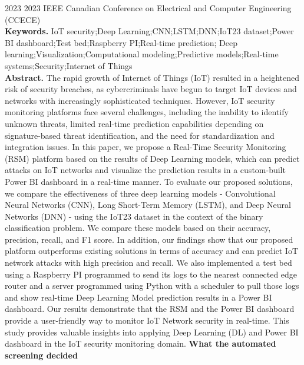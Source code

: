 \documentclass[11pt,a4paper]{article}
\begin{document}
{\color{soft}\small 2023 \textperiodcentered{} 2023 IEEE Canadian Conference on Electrical and Computer Engineering (CCECE)}\\[2mm]
{\small\textbf{Keywords.} IoT security;Deep Learning;CNN;LSTM;DNN;IoT23 dataset;Power BI dashboard;Test bed;Raspberry PI;Real-time prediction; Deep learning;Visualization;Computational modeling;Predictive models;Real-time systems;Security;Internet of Things}\\[2mm]
{\small\textbf{Abstract.} The rapid growth of Internet of Things (IoT) resulted in a heightened risk of security breaches, as cybercriminals have begun to target IoT devices and networks with increasingly sophisticated techniques. However, IoT security monitoring platforms face several challenges, including the inability to identify unknown threats, limited real-time prediction capabilities depending on signature-based threat identification, and the need for standardization and integration issues. In this paper, we propose a Real-Time Security Monitoring (RSM) platform based on the results of Deep Learning models, which can predict attacks on IoT networks and visualize the prediction results in a custom-built Power BI dashboard in a real-time manner. To evaluate our proposed solutions, we compare the effectiveness of three deep learning models - Convolutional Neural Networks (CNN), Long Short-Term Memory (LSTM), and Deep Neural Networks (DNN) - using the IoT23 dataset in the context of the binary classification problem. We compare these models based on their accuracy, precision, recall, and F1 score. In addition, our findings show that our proposed platform outperforms existing solutions in terms of accuracy and can predict IoT network attacks with high precision and recall. We also implemented a test bed using a Raspberry PI programmed to send its logs to the nearest connected edge router and a server programmed using Python with a scheduler to pull those logs and show real-time Deep Learning Model prediction results in a Power BI dashboard. Our results demonstrate that the RSM and the Power BI dashboard provide a user-friendly way to monitor IoT Network security in real-time. This study provides valuable insights into applying Deep Learning (DL) and Power BI dashboard in the IoT security monitoring domain.}
\vspace{3mm}
\vspace{2.5mm}
{\small\textbf{What the automated screening decided}}\\[2mm]
\end{document}
